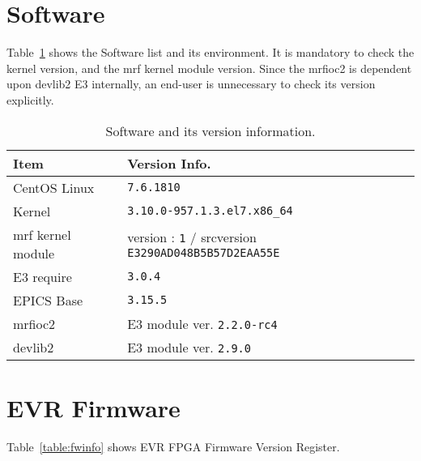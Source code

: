 \documentclass[11pt
  , a4paper
  , article
  , oneside
  , showtrims
]{memoir}
\begin{document}
\section{Software}
Table~\ref{table:swlist} shows the Software list and its environment. It is mandatory to check the kernel version, and the mrf kernel module version. Since the mrfioc2 is dependent upon devlib2 E3 internally, an end-user is unnecessary to check its version explicitly.
\begin{table}[!htb]
  \centering
  \begin{tabular}{l|l}
    \toprule
    Item               & Version Info.                                                      \\\midrule
    CentOS Linux       & \texttt{7.6.1810}                                                  \\\midrule
    Kernel             & \texttt{3.10.0-957.1.3.el7.x86\_64}                                \\\midrule
    mrf kernel module  & version : \texttt{1} / srcversion \texttt{E3290AD048B5B57D2EAA55E} \\\midrule
    E3 require         & \texttt{3.0.4}                                                     \\\midrule
    EPICS Base         & \texttt{3.15.5}                                                    \\\midrule
    mrfioc2            & E3 module ver. \texttt{2.2.0-rc4}                                  \\\midrule
    devlib2            & E3 module ver. \texttt{2.9.0}                                      \\\bottomrule
  \end{tabular}
  \caption[]{Software and its version information.}
  \label{table:swlist}
\end{table}


\section{EVR Firmware}
Table~\ref{table:fwinfo} shows EVR FPGA Firmware Version Register.
\end{document}
